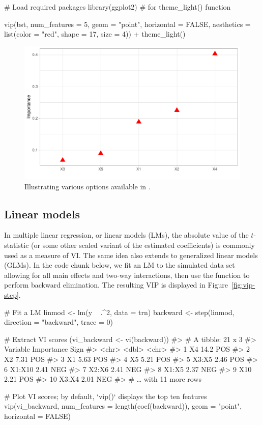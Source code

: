 \begin{example}
# Load required packages
library(ggplot2)  # for theme_light() function

vip(bst, num_features = 5, geom = "point", horizontal = FALSE, 
    aesthetics = list(color = "red", shape = 17, size = 4)) +
  theme_light()
\end{example}

\begin{figure}[!htb]
  \centering 
  \includegraphics[width=1\linewidth]{figures/dot-plot} 
  \caption{Illustrating various options available in .}
  \label{fig:dot-plot}
\end{figure}


\subsection{Linear models}

In multiple linear regression, or linear models (LMs), the absolute value of the $t$-statistic (or some other scaled variant of the estimated coefficients) is commonly used as a measure of VI. The same idea also extends to generalized linear models (GLMs). In the code chunk below, we fit an LM to the simulated  data set allowing for all main effects and two-way interactions, then use the  function to perform backward elimination. The resulting VIP is displayed in Figure~\ref{fig:vip-step}.

\begin{example}
# Fit a LM
linmod <- lm(y ~ .^2, data = trn)
backward <- step(linmod, direction = "backward", trace = 0)

# Extract VI scores
(vi_backward <- vi(backward))
#> # A tibble: 21 x 3
#>    Variable Importance Sign 
#>    <chr>         <dbl> <chr>
#>  1 X4            14.2  POS  
#>  2 X2             7.31 POS  
#>  3 X1             5.63 POS  
#>  4 X5             5.21 POS  
#>  5 X3:X5          2.46 POS  
#>  6 X1:X10         2.41 NEG  
#>  7 X2:X6          2.41 NEG  
#>  8 X1:X5          2.37 NEG  
#>  9 X10            2.21 POS  
#> 10 X3:X4          2.01 NEG  
#> # … with 11 more rows

# Plot VI scores; by default, `vip()` displays the top ten features
vip(vi_backward, num_features = length(coef(backward)), 
    geom = "point", horizontal = FALSE)
\end{example}

